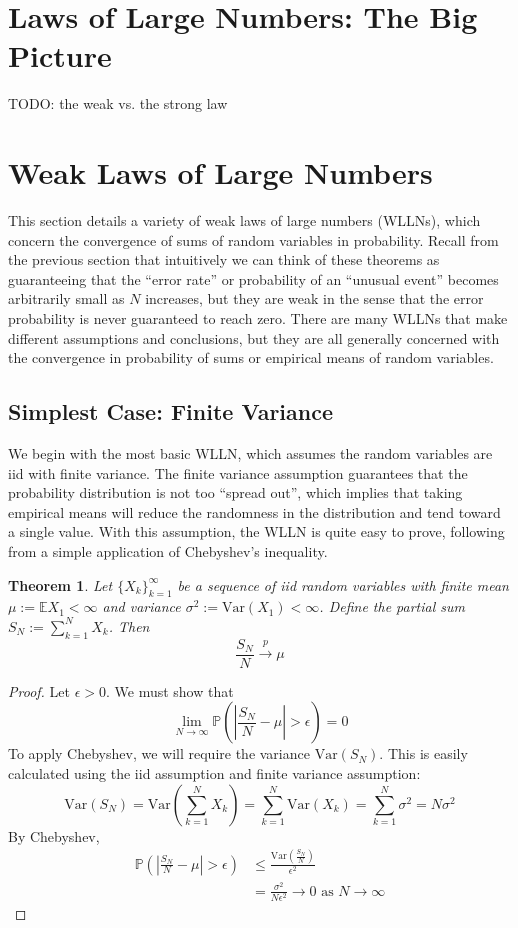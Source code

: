 \documentclass[12pt]{article}
\newcommand*{\abs}[1]{\left\lvert#1\right\rvert}
\newcommand{\E}{\mathbb{E}}
\newcommand{\Var}{\mathrm{Var}}
\newcommand{\Prob}{\mathbb{P}}
\newtheorem{thm}{Theorem}
\begin{document}
\section{Laws of Large Numbers: The Big Picture}
TODO: the weak vs. the strong law

\section{Weak Laws of Large Numbers}
This section details a variety of weak laws of large numbers (WLLNs), which concern the convergence of sums of random variables in probability. Recall from the previous section that intuitively we can think 
of these theorems as guaranteeing that the ``error rate'' or probability of an ``unusual event'' becomes arbitrarily small as $N$ increases, but they are weak in the sense that the error probability is never guaranteed 
to reach zero. There are many WLLNs that make different assumptions and conclusions, but they are all generally concerned with the convergence in probability of sums or empirical means of random variables. 

\subsection{Simplest Case: Finite Variance}
We begin with the most basic WLLN, which assumes the random variables are iid with finite variance. The finite variance assumption guarantees that the probability distribution is not too ``spread out'', which implies 
that taking empirical means will reduce the randomness in the distribution and tend toward a single value. With this assumption, the WLLN is quite easy to prove, following from a simple application of Chebyshev's 
inequality. 
\begin{thm} 
Let $\{X_k\}_{k = 1}^{\infty}$ be a sequence of iid random variables with finite mean $\mu := \E X_1 < \infty$ and variance $\sigma^2 := \Var(X_1) < \infty$. Define the partial sum $S_N := \sum_{k = 1}^{N} X_k$. Then 
\[\frac{S_N}{N} \overset{p}{\to} \mu\]
\end{thm}

\begin{proof}
Let $\epsilon > 0$. We must show that 
\[\lim_{N \to \infty} \Prob\left(\abs{\frac{S_N}{N} - \mu} > \epsilon \right) = 0\]
To apply Chebyshev, we will require the variance $\Var(S_N)$. This is easily calculated using the iid assumption and finite variance assumption:
\[\Var(S_N) = \Var\left(\sum_{k = 1}^{N} X_k \right) = \sum_{k = 1}^{N} \Var(X_k) =  \sum_{k = 1}^{N} \sigma^2 = N\sigma^2 \]
By Chebyshev, 
\begin{align*}
\Prob\left(\abs{\frac{S_N}{N} - \mu} > \epsilon \right) &\leq \frac{\Var\left(\frac{S_N}{N}\right)}{\epsilon^2} \\
									       &= \frac{\sigma^2}{N\epsilon^2} \to 0 \text{ as } N \to \infty 
\end{align*}
\end{proof}
\end{document}
